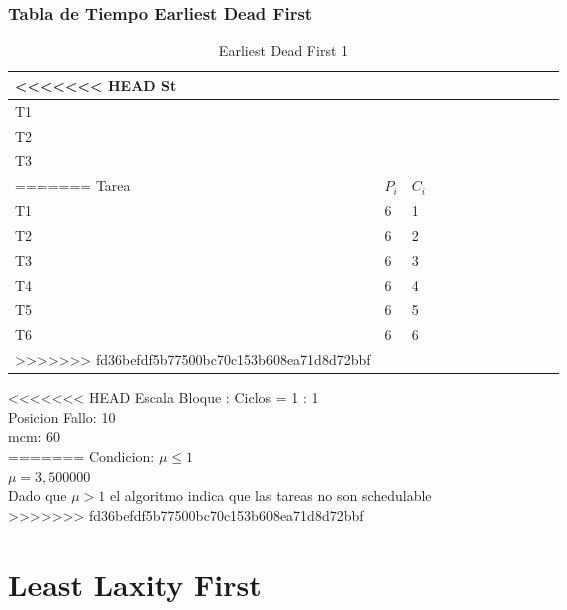 \documentclass[xcolor=table]{beamer}
\begin{document}
\begin{frame} 
\frametitle{Tabla de Tiempo  Earliest Dead First } 
\begin{table} 
\centering 
\begin{tabular}{|l|l|l|l|l|l|l|l|l|l|l|l|} 
\hline 
<<<<<<< HEAD
St & \cellcolor{green} & \cellcolor{green} & \cellcolor{green} & \cellcolor{green} & \cellcolor{green} & \cellcolor{green} & \cellcolor{green} & \cellcolor{green} & \cellcolor{green} & \cellcolor{green} & \cellcolor{red} \\ \hline 
T1 & \cellcolor{blue} & & & & & \cellcolor{blue} & & & \cellcolor{blue} & & \\ \hline 
T2 & & & & \cellcolor{purple} & \cellcolor{purple} & & & & & \cellcolor{purple} & \cellcolor{purple} \\ \hline 
T3 & & \cellcolor{cyan} & \cellcolor{cyan} & & & & \cellcolor{cyan} & \cellcolor{cyan} & & & \\ \hline 
=======
\cellcolor{lightgray}Tarea & \cellcolor{lightgray}$P_i$ & \cellcolor{lightgray}$C_i$ \\ \hline 
T1   & 6  &  1\\ \hline 
T2   & 6  &  2\\ \hline 
T3   & 6  &  3\\ \hline 
T4   & 6  &  4\\ \hline 
T5   & 6  &  5\\ \hline 
T6   & 6  &  6\\ \hline 
>>>>>>> fd36befdf5b77500bc70c153b608ea71d8d72bbf
\end{tabular} 
\caption{ Earliest Dead First 1 } 
\end{table} 
<<<<<<< HEAD
Escala Bloque : Ciclos = 1 : 1 \\ 
Posicion Fallo:  10 \\ 
mcm:  60 \\ 
=======
Condicion: $\mu \leq 1$ \\ 
$\mu =  3,500000 $ \\ 
Dado que $\mu>1$ el algoritmo indica que las tareas no son schedulable \\ 
>>>>>>> fd36befdf5b77500bc70c153b608ea71d8d72bbf
\end{frame} 


\section{Least Laxity First}
\end{document}
